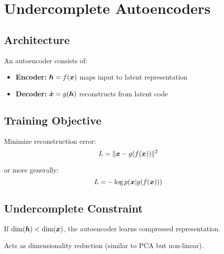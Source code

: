
\section{Undercomplete Autoencoders}
\label{sec:undercomplete-ae}

\subsection{Architecture}

An autoencoder consists of:
\begin{itemize}
    \item \textbf{Encoder:} $\boldsymbol{h} = f(\boldsymbol{x})$ maps input to latent representation
    \item \textbf{Decoder:} $\hat{\boldsymbol{x}} = g(\boldsymbol{h})$ reconstructs from latent code
\end{itemize}

\subsection{Training Objective}

Minimize reconstruction error:
\begin{equation}
L = \|\boldsymbol{x} - g(f(\boldsymbol{x}))\|^2
\end{equation}

or more generally:
\begin{equation}
L = -\log p(\boldsymbol{x} | g(f(\boldsymbol{x})))
\end{equation}

\subsection{Undercomplete Constraint}

If $\dim(\boldsymbol{h}) < \dim(\boldsymbol{x})$, the autoencoder learns compressed representation.

Acts as dimensionality reduction (similar to PCA but non-linear).

